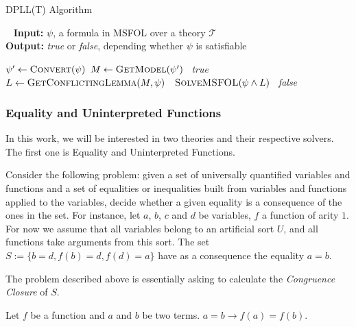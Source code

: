\begin{algorithm}[H]
\caption{DPLL(T) Algorithm}~\label{dpllTAlgo}
\textbf{Input:} $\psi$, a formula in MSFOL over a theory  $\mathcal{T}$ \\
\textbf{Output:} \textit{true} or \textit{false}, depending whether $\psi$ is satisfiable
\begin{algorithmic}
\State $\psi' \gets \Call{Convert}{\psi}$ 
  \State $M \gets \Call{GetModel}{\psi'}$
   
    \State~\Return \textit{true}
  \Else
    \State $L \gets \Call{GetConflictingLemma}{M, \psi}$
    \State~\Return $\Call{SolveMSFOL}{\psi \wedge L}$
  \EndIf
\Else
  \State~\Return \textit{false}
\EndIf


\EndFunction
\end{algorithmic}
\end{algorithm}

\subsubsection{Equality and Uninterpreted Functions}

In this work, we will be interested in two theories and their respective solvers. The first one is Equality and Uninterpreted Functions.

Consider the following problem: given a set of universally quantified variables and functions and a set of equalities or inequalities built from variables and functions applied to the variables, decide whether a given equality is a consequence of the ones in the set. For instance, let $a$, $b$, $c$ and $d$ be variables, $f$ a function of arity $1$. For now we assume that all variables belong to an artificial sort $U$, and all functions take arguments from this sort. The set $S := \{b = d, f(b) = d, f(d) = a\}$ have as a consequence the equality $a = b$.

The problem described above is essentially asking to calculate the \textit{Congruence Closure} of $S$.


\begin{theorem}[Congruence]
Let $f$ be a function and $a$ and $b$ be two terms. $a = b \rightarrow f(a) = f(b)$.
\end{theorem}


